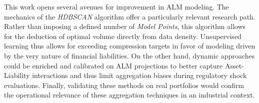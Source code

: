 This work opens several avenues for improvement in ALM modeling. The mechanics of the \textit{HDBSCAN} algorithm offer a particularly relevant research path. Rather than imposing a defined number of \textit{Model Points}, this algorithm allows for the deduction of optimal volume directly from data density. Unsupervised learning thus allows for exceeding compression targets in favor of modeling driven by the very nature of financial liabilities. On the other hand, dynamic approaches could be enriched and calibrated on ALM projections to better capture Asset-Liability interactions and thus limit aggregation biases during regulatory shock evaluations. Finally, validating these methods on real portfolios would confirm the operational relevance of these aggregation techniques in an industrial context.